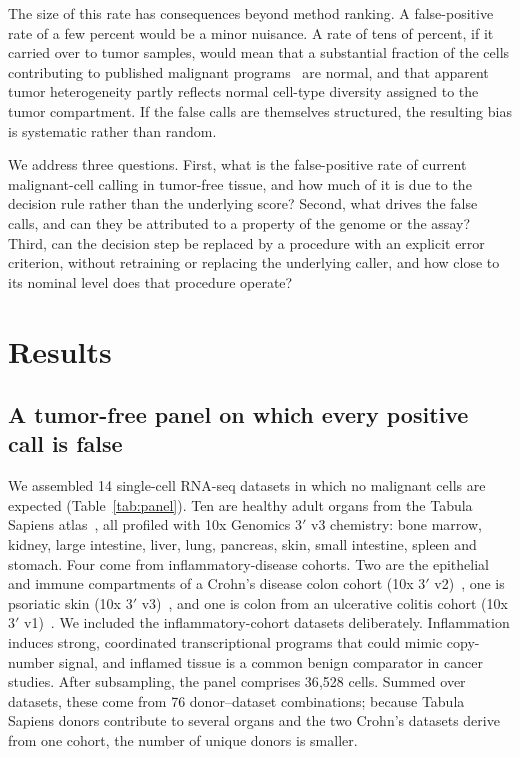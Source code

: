 \documentclass[11pt,letterpaper]{article}
\begin{document}
The size of this rate has consequences beyond method ranking. A false-positive rate of a few percent would be a minor nuisance. A rate of tens of percent, if it carried over to tumor samples, would mean that a substantial fraction of the cells contributing to published malignant programs~\cite{barkley2022,gavish2023} are normal, and that apparent tumor heterogeneity partly reflects normal cell-type diversity assigned to the tumor compartment. If the false calls are themselves structured, the resulting bias is systematic rather than random.

We address three questions. First, what is the false-positive rate of current malignant-cell calling in tumor-free tissue, and how much of it is due to the decision rule rather than the underlying score? Second, what drives the false calls, and can they be attributed to a property of the genome or the assay? Third, can the decision step be replaced by a procedure with an explicit error criterion, without retraining or replacing the underlying caller, and how close to its nominal level does that procedure operate?

\section{Results}

\subsection{A tumor-free panel on which every positive call is false}

We assembled 14 single-cell RNA-seq datasets in which no malignant cells are expected (Table~\ref{tab:panel}). Ten are healthy adult organs from the Tabula Sapiens atlas~\cite{tabula}, all profiled with 10x Genomics 3$'$ v3 chemistry: bone marrow, kidney, large intestine, liver, lung, pancreas, skin, small intestine, spleen and stomach. Four come from inflammatory-disease cohorts. Two are the epithelial and immune compartments of a Crohn's disease colon cohort (10x 3$'$ v2)~\cite{kong2023}, one is psoriatic skin (10x 3$'$ v3)~\cite{gao2021pso}, and one is colon from an ulcerative colitis cohort (10x 3$'$ v1)~\cite{smillie2019}. We included the inflammatory-cohort datasets deliberately. Inflammation induces strong, coordinated transcriptional programs that could mimic copy-number signal, and inflamed tissue is a common benign comparator in cancer studies. After subsampling, the panel comprises 36{,}528 cells. Summed over datasets, these come from 76 donor--dataset combinations; because Tabula Sapiens donors contribute to several organs and the two Crohn's datasets derive from one cohort, the number of unique donors is smaller.
\end{document}

